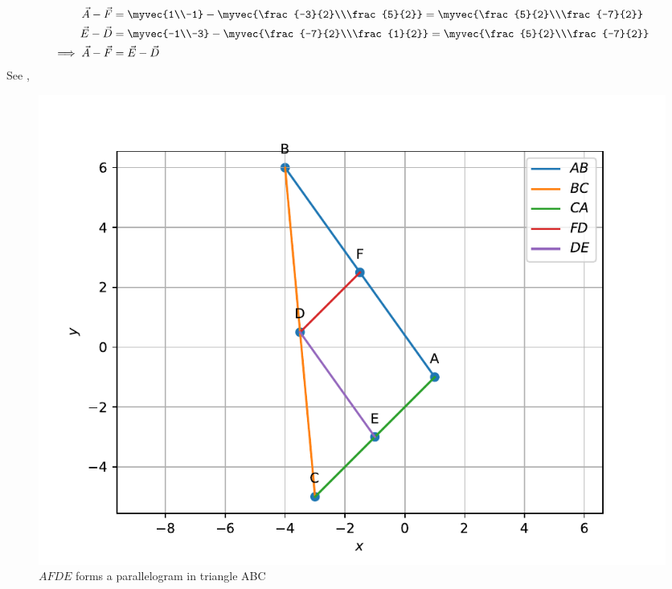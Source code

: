 \\ \solution 
\begin{align}
    \vec{A}-\vec{F}&=\myvec{1\\-1}-\myvec{\frac{-3}{2}\\\frac{5}{2}}
    =\myvec{\frac{5}{2}\\\frac{-7}{2}}
    \\
    \vec{E}-\vec{D}&=\myvec{-1\\-3}-\myvec{\frac{-7}{2}\\\frac{1}{2}}
    =\myvec{\frac{5}{2}\\\frac{-7}{2}}
    \\
	\implies	\vec{A}-\vec{F} &= \vec{E}-\vec{D}
\end{align}
See , 
\begin{figure}
\centering
\includegraphics[width=\columnwidth]{figs/triangle/pgm.pdf}
\caption{$AFDE$ forms a parallelogram in triangle ABC}
\label{fig:Triangle-pgm}
\end{figure}





















